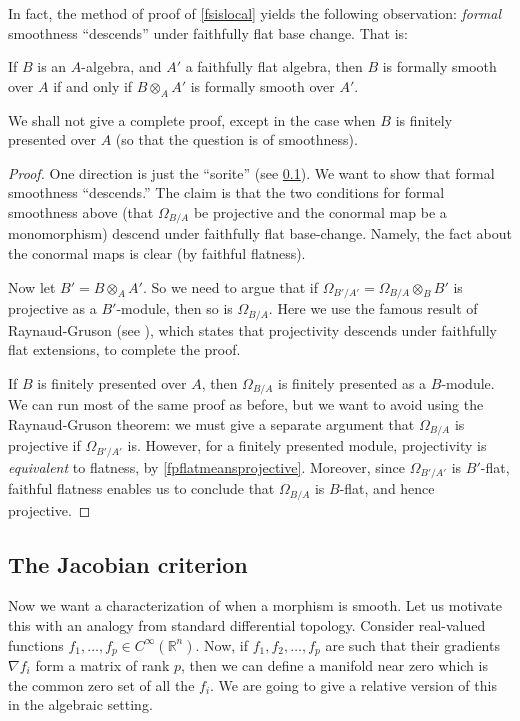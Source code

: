 In fact, the method of proof of \cref{fsislocal} yields the following
observation: \emph{formal} smoothness ``descends'' under faithfully flat base change.
That is:
\begin{corollary} 
If $B$ is an $A$-algebra, and $A'$ a faithfully flat algebra, then $B$ is
formally smooth over $A$ if and only if $B \otimes_A A'$ is formally smooth
over $A'$.
\end{corollary} 
We shall not give a complete proof, except in the case when $B$ is finitely
presented over $A$ (so that the question is of smoothness).
\begin{proof} 
One direction is  just the ``sorite'' (see \cref{}). We want to show that
formal smoothness ``descends.'' 
The claim is that the two conditions for formal smoothness above (that
$\Omega_{B/A}$ be projective and the conormal map be a monomorphism) descend
under faithfully flat base-change. Namely, the fact about the conormal maps is
clear (by faithful flatness). 

Now let $B' = B \otimes_A A'$.
So we need to argue that if $\Omega_{B'/A'} = \Omega_{B/A} \otimes_B
B'$ is projective as a $B'$-module, then so is $\Omega_{B/A}$. Here we use the
famous result of Raynaud-Gruson (see \cite{RG71}), which states that
projectivity descends under faithfully flat extensions, to complete the proof.

If $B$ is finitely presented over $A$, then $\Omega_{B/A}$ is finitely
presented as a $B$-module. 
We can run most of the same proof as before, but we want to avoid using the
Raynaud-Gruson theorem: we must give a separate argument that $\Omega_{B/A}$ is
projective if $\Omega_{B'/A'}$ is. However, for a finitely presented module,
projectivity is \emph{equivalent} to flatness, by \cref{fpflatmeansprojective}. Moreover, since $\Omega_{B'/A'}$
is $B'$-flat, faithful flatness enables us to conclude that $\Omega_{B/A}$ is
$B$-flat, and hence projective.
\end{proof} 



\subsection{The Jacobian criterion}


Now we want  a characterization of when a morphism is smooth. Let us
motivate this with an analogy from standard differential topology. 
Consider real-valued functions $f_1, \dots, f_p \in C^{\infty}(\mathbb{R}^n)$.
Now, if $f_1, f_2, \dots, f_p$ are such that their gradients $\nabla f_i$ form a
matrix of rank $p$, then we can define a manifold near zero
which is the common zero set of all the $f_i$.
We are going to give a relative version of this in the algebraic setting.



